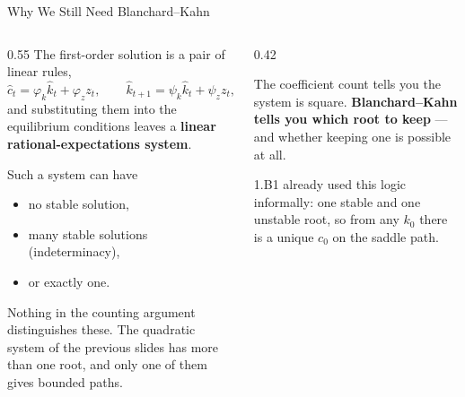 \begin{frame}{Why We Still Need Blanchard--Kahn}
\begin{columns}[T]
\begin{column}{0.55\textwidth}
\small
The first-order solution is a pair of linear rules,
\[
  \hat{c}_t=\varphi_k\hat{k}_t+\varphi_z z_t,
  \qquad
  \hat{k}_{t+1}=\psi_k\hat{k}_t+\psi_z z_t ,
\]
and substituting them into the equilibrium conditions leaves a \textbf{linear rational-expectations system}.
\medskip

Such a system can have
\begin{itemize}\small
  \item no stable solution,
  \item many stable solutions (indeterminacy),
  \item or exactly one.
\end{itemize}
\medskip
Nothing in the counting argument distinguishes these. The quadratic system of the previous slides has more than one root, and only one of them gives bounded paths.
\end{column}
\begin{column}{0.42\textwidth}
\begin{takeawaybox}\footnotesize
The coefficient count tells you the system is square. \textbf{Blanchard--Kahn tells you which root to keep} --- and whether keeping one is possible at all.
\end{takeawaybox}
\medskip
\begin{examplebox}\footnotesize
1.B1 already used this logic informally: one stable and one unstable root, so from any $k_0$ there is a unique $c_0$ on the saddle path.
\end{examplebox}
\end{column}
\end{columns}
\vspace{1mm}
\end{frame}

